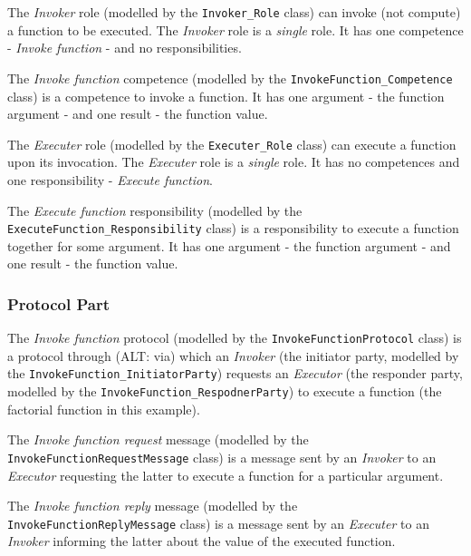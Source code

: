 The \textit{Invoker} role (modelled by the \texttt{Invoker\_Role} class) can invoke (not compute) a function to be executed.
The \textit{Invoker} role is a \textit{single} role.
It has one competence - \textit{Invoke function} - and no responsibilities.

The \textit{Invoke function} competence (modelled by the \texttt{InvokeFunction\_Competence} class) is a competence to invoke a function.
It has one argument - the function argument - and one result - the function value. 

The \textit{Executer} role (modelled by the \texttt{Executer\_Role} class) can execute a function upon its invocation.
The \textit{Executer} role is a \textit{single} role.
It has no competences and one responsibility - \textit{Execute function}.

The \textit{Execute function} responsibility (modelled by the \texttt{ExecuteFunction\_Responsibility} class) is a responsibility to execute a function together for some argument.
It has one argument - the function argument - and one result - the function value.

\subsubsection*{Protocol Part}

The \textit{Invoke function} protocol (modelled by the \texttt{InvokeFunctionProtocol} class) is a protocol through (ALT: via) which an \textit{Invoker} (the initiator party, modelled by the \texttt{InvokeFunction\_InitiatorParty}) requests an \textit{Executor} (the responder party, modelled by the \texttt{InvokeFunction\_RespodnerParty}) to execute a function (the factorial function in this example).

The \textit{Invoke function request} message (modelled by the \texttt{InvokeFunctionRequestMessage} class) is a message sent by an \textit{Invoker} to an \textit{Executor} requesting the latter to execute a function for a particular argument.

The \textit{Invoke function reply} message (modelled by the \texttt{InvokeFunctionReplyMessage} class) is a message sent by an \textit{Executer} to an \textit{Invoker} informing the latter about the value of the executed function.

